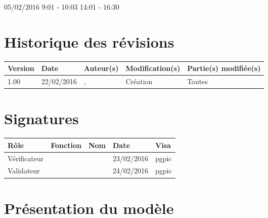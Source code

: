 \documentclass [a4paper] {article}
\begin{document}
05/02/2016			 				%
\hfill   
\hfill 	 9:01 - 10:03 	14:01 - 16:30			%


\section*{Historique des révisions}
\begin{center}
			\begin{tabular}{| p{2.5cm} | p{3cm} | p{3cm} | p{3cm} | p{3.5cm} |}
				\hline
				\rowcolor{Gray}
				Version & Date & Auteur(s) & Modification(s) & Partie(s) modifiée(s)		 \\
				\hline
				1.00 & 22/02/2016 & \Pierre, \Kafui & Création & Toutes \\
		\hline		
			\end{tabular}
		\end{center}

\section*{Signatures}

		\begin{center}
			\begin{tabular}{| p{2.5cm} | p{4cm} | p{3cm} | p{3cm} | p{2.5cm} |}
				\hline
				\rowcolor{Gray}
				Rôle & Fonction & Nom & Date & Visa		 \\
				\hline
				Vérificateur & \RGC & \Mathieu & 23/02/2016 & pgpic \\[30pt]
				\hline
				Validateur & \CP & \Sergi & 24/02/2016 & pgpic \\[30pt]	
				\hline
			\end{tabular}
		\end{center}


\section{Présentation du modèle \EA{}}
\end{document}

